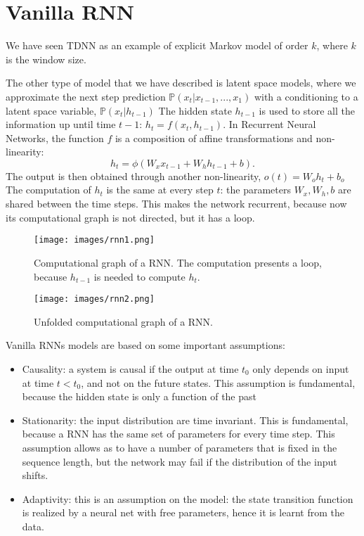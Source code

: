 \documentclass[oneside]{book}
\newcommand{\pr}{\mathbb{P}}
\theoremstyle{definition}
\theoremstyle{plain}
\begin{document}
\section{Vanilla RNN}
We have seen TDNN as an example of explicit Markov model of order $k$, where $k$ is the window size.

The other type of model that we have described is latent space models, where we approximate the next step prediction $\pr(x_{t}|x_{t-1},...,x_1)$ with a conditioning to a latent space variable, $\pr(x_t|h_{t-1})$
The hidden state $h_{t-1}$ is used to store all the information up until time $t-1$: $h_t=f(x_t, h_{t-1})$.
In Recurrent Neural Networks, the function $f$ is a composition of affine transformations and non-linearity:
\begin{equation}\label{eqn:rnn}
    h_t=\phi(W_xx_{t-1} + W_h h_{t-1}+ b).
\end{equation}
The output is then obtained through another non-linearity, $ o(t)=W_oh_t+b_o$ 
The computation of $h_t$ is the same at every step $t$: the parameters $W_x, W_h,b$ are shared between the time steps. This makes the network recurrent, because now its computational graph is not directed, but it has a loop.

\begin{figure}
    \centering
        \texttt{[image: images/rnn1.png]}
        \caption{Computational graph of a RNN. The computation presents a loop, because $h_{t-1}$ is needed to compute $h_t$.}
        \label{fig:rnn-comp-graph}
\end{figure}
\begin{figure}
    \centering
        \texttt{[image: images/rnn2.png]}
        \caption{Unfolded computational graph of a RNN.}
        \label{fig:rnn-comp-graph2}
\end{figure}

Vanilla RNNs models are based on some important assumptions:
\begin{itemize}
    \item Causality: a system is causal if the output at time $t_0$ only depends on
input at time $t<t_0$, and not on the future states. This assumption is fundamental, because the hidden state is only a function of the past
    \item Stationarity: the input distribution are time invariant. This is fundamental, because a RNN has the same set of parameters for every time step. This assumption allows as to have a number of parameters that is fixed in the sequence length, but the network may fail if the distribution of the input shifts.
    \item Adaptivity: this is an assumption on the model: the state transition function is realized by a neural net with free parameters, hence it is learnt from the data.
\end{itemize}
\end{document}
